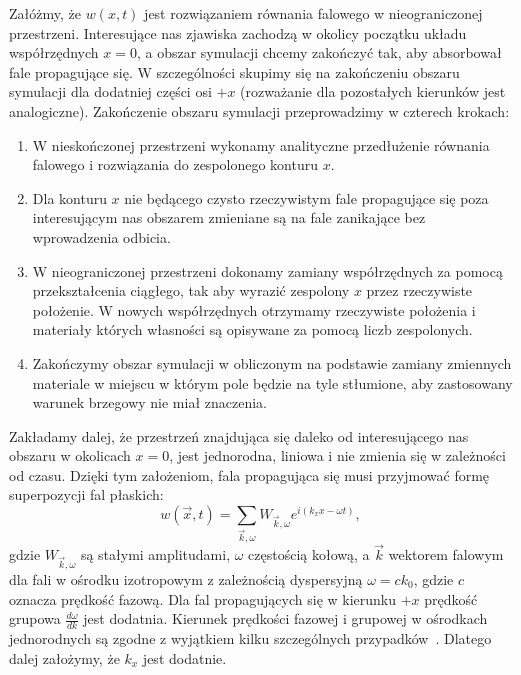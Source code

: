 Załóżmy, że $w(x,t)$ jest rozwiązaniem równania falowego w nieograniczonej przestrzeni. Interesujące nas zjawiska zachodzą w okolicy początku układu współrzędnych $x=0$, a obszar symulacji chcemy zakończyć tak, aby absorbował fale propagujące się. W szczególności skupimy się na zakończeniu obszaru symulacji dla dodatniej części osi $+x$ (rozważanie dla pozostałych kierunków jest analogiczne). Zakończenie obszaru symulacji przeprowadzimy w czterech krokach:
\begin{enumerate}
	\item W nieskończonej przestrzeni wykonamy analityczne przedłużenie równania falowego i rozwiązania do zespolonego konturu $x$.
	\item Dla konturu $x$ nie będącego czysto rzeczywistym fale propagujące się poza interesującym nas obszarem zmieniane są na fale zanikające bez wprowadzenia odbicia.
	\item W nieograniczonej przestrzeni dokonamy zamiany współrzędnych za pomocą przekształcenia ciągłego, tak aby wyrazić zespolony $x$ przez rzeczywiste położenie. W nowych współrzędnych otrzymamy rzeczywiste położenia i materiały których własności są opisywane za pomocą liczb zespolonych.
	\item Zakończymy obszar symulacji w obliczonym na podstawie zamiany zmiennych materiale w miejscu w którym pole będzie na tyle stłumione, aby zastosowany warunek brzegowy nie miał znaczenia.
\end{enumerate}

Zakładamy dalej, że przestrzeń znajdująca się daleko od interesującego nas obszaru w okolicach $x=0$, jest jednorodna, liniowa i nie zmienia się w zależności od czasu. Dzięki tym założeniom, fala propagująca się musi przyjmować formę superpozycji fal płaskich:
\begin{equation}
	w(\vec{x},t)= \sum_{\vec{k},\omega} W_{\vec{k},\omega} e^{i (k_x x-\omega t)},
\end{equation}
gdzie $W_{\vec{k},\omega}$ są stałymi amplitudami, $\omega$ częstością kołową, a $\vec{k}$ wektorem falowym dla fali w ośrodku izotropowym z zależnością dyspersyjną $\omega=c k_0$, gdzie $c$ oznacza prędkość fazową. Dla fal propagujących się w kierunku $+x$ prędkość grupowa $\frac{d \omega}{d k}$ jest dodatnia. Kierunek prędkości fazowej i grupowej w ośrodkach jednorodnych są zgodne z wyjątkiem kilku szczególnych przypadków~\cite{teixeira1998general}. Dlatego dalej założymy, że $k_x$ jest dodatnie. 


